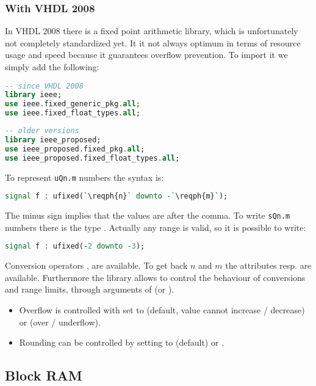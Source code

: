 \documentclass[margin=small]{tex/hsrzf}
\begin{document}
\subsubsection{With VHDL 2008 }

In VHDL 2008 there is a fixed point arithmetic library, which is unfortunately not completely standardized yet. It it not always optimum in terms of resource usage and speed because it guarantees overflow prevention. To import it we simply add the following:
\begin{lstlisting}[language = vhdl]
-- since VHDL 2008
library ieee;
use ieee.fixed_generic_pkg.all;
use ieee.fixed_float_types.all;
\end{lstlisting}
\begin{lstlisting}[language = vhdl]
-- older versions
library ieee_proposed;
use ieee_proposed.fixed_pkg.all;
use ieee_proposed.fixed_float_types.all;
\end{lstlisting}
To represent \texttt{uQn.m} numbers the syntax is:
\begin{lstlisting}[language = vhdl]
signal f : ufixed(`\reqph{n}` downto -`\reqph{m}`);
\end{lstlisting}
The minus sign implies that the values are after the comma.  To write \texttt{sQn.m} numbers there is the type .  Actually any range is valid, so it is possible to write:
\begin{lstlisting}[language = vhdl]
signal f : ufixed(-2 downto -3);
\end{lstlisting}

Conversion operators ,  are available. To get back \(n\) and \(m\) the attributes  resp.  are available. Furthermore the library allows to control the behaviour of conversions and range limits, through arguments of  (or ).
\begin{itemize}
  \item Overflow is controlled with  set to  (default, value cannot increase / decrease) or  (over / underflow).
  \item Rounding can be controlled by setting  to  (default) or .
\end{itemize}

\subsection{Block RAM}
\end{document}
